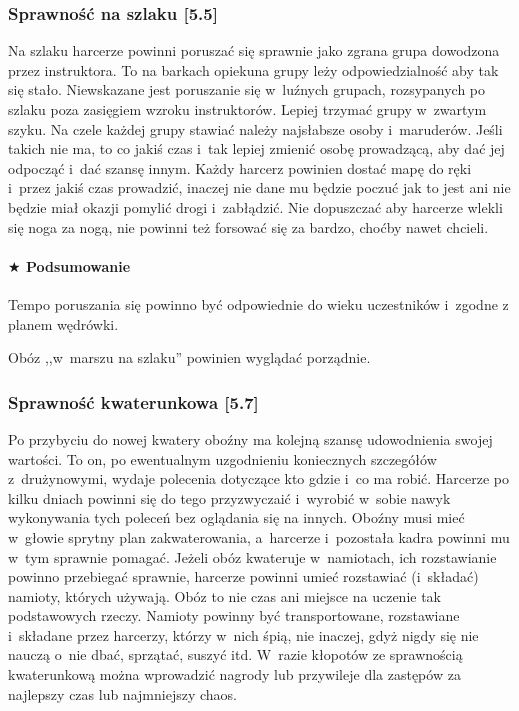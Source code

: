 \documentclass[a5paper,10pt,titlepage,twoside]{article}
\newcommand*{\thecheckbox}{\hss$\Box$} %
\newenvironment*{checklist}
{\list{}{%
\renewcommand*{\makelabel}[1]{\thecheckbox}}}
{\endlist}
\begin{document}
\subsubsection{Sprawność na szlaku [5.5]}
Na szlaku harcerze powinni poruszać się sprawnie jako zgrana grupa dowodzona przez instruktora. To na barkach opiekuna grupy leży odpowiedzialność aby tak się stało. Niewskazane jest poruszanie się w~luźnych grupach, rozsypanych po szlaku poza zasięgiem wzroku instruktorów. Lepiej trzymać grupy w~zwartym szyku. Na czele każdej grupy stawiać należy najsłabsze osoby i~maruderów. Jeśli takich nie ma, to co jakiś czas i~tak lepiej zmienić osobę prowadzącą, aby dać jej odpocząć i~dać szansę innym. Każdy harcerz powinien dostać mapę do ręki i~przez jakiś czas prowadzić, inaczej nie dane mu będzie poczuć jak to jest ani nie będzie miał okazji pomylić drogi i~zabłądzić. Nie dopuszczać aby harcerze wlekli się noga za nogą, nie powinni też forsować się za bardzo, choćby nawet chcieli.
\paragraph{$\bigstar$ Podsumowanie}
\begin{checklist}
\item Tempo poruszania się powinno być odpowiednie do wieku uczestników i~zgodne z planem wędrówki.
\item Obóz ,,w~marszu na szlaku'' powinien wyglądać porządnie.
\end{checklist}
\subsubsection{Sprawność kwaterunkowa [5.7]}
Po przybyciu do nowej kwatery oboźny ma kolejną szansę udowodnienia swojej wartości. To on, po ewentualnym uzgodnieniu koniecznych szczegółów z~drużynowymi, wydaje polecenia dotyczące kto gdzie i~co ma robić. Harcerze po kilku dniach powinni się do tego przyzwyczaić i~wyrobić w~sobie nawyk wykonywania tych poleceń bez oglądania się na innych. Oboźny musi mieć w~głowie sprytny plan zakwaterowania, a~harcerze i~pozostała kadra powinni mu w~tym sprawnie pomagać. Jeżeli obóz kwateruje w~namiotach, ich rozstawianie powinno przebiegać sprawnie, harcerze powinni umieć rozstawiać (i~składać) namioty, których używają. Obóz to nie czas ani miejsce na uczenie tak podstawowych rzeczy. Namioty powinny być transportowane, rozstawiane i~składane przez harcerzy, którzy w~nich śpią, nie inaczej, gdyż nigdy się nie nauczą o~nie dbać, sprzątać, suszyć itd. W~razie kłopotów ze sprawnością kwaterunkową można wprowadzić nagrody lub przywileje dla zastępów za najlepszy czas lub najmniejszy chaos.
\end{document}
